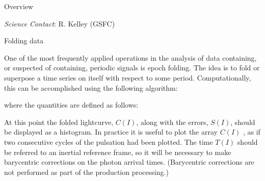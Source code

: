 %
\def\version{\it Version 1.0 --- 5/14/86}
\def\chapter{\it Timing Analysis: Folding and Period Searches}

\@{Overview}

\noindent
{\it Science Contact}:  R. Kelley (GSFC)


\@{Folding data}

One of the most frequently applied operations in the analysis of data
containing, or suspected of containing, periodic signals is epoch folding.  The
idea is to fold or superpose a time series on itself with respect to some
period.  Computationally, this can be accomplished using the following
algorithm:

\vskip 12pt


where the quantities are defined as follows:

\vskip 12pt

\vskip 12pt

At this point the folded lightcurve, $C(I)$, along with the errors, $S(I)$, should
be displayed as a histogram.  In practice it is useful to plot the array
$C(I)$ , as if two consecutive cycles of the pulsation had been plotted.
The time $T(I)$ should be referred to an inertial reference frame, so it will be
necessary to make barycentric corrections on the photon arrival times.
(Barycentric corrections are not performed as part of the production processing.)


